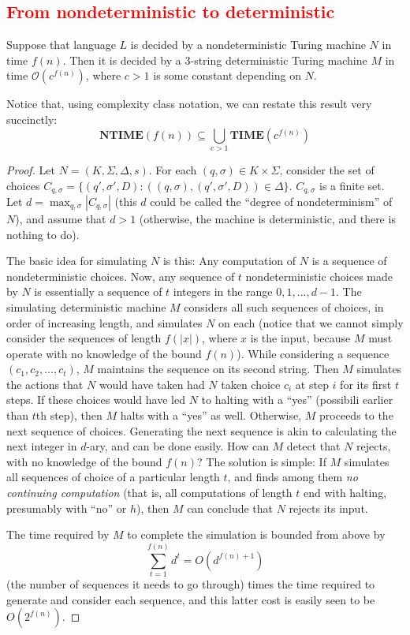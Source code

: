 \documentclass[12pt]{article}
\begin{document}
\subsection{\textcolor{red}{From nondeterministic to deterministic}}
\begin{defbox}[\textcolor{red}{Theorem (from nondeterministic to deterministic)}]
  Suppose that language $L$ is decided by a nondeterministic Turing machine $N$ in time $f(n)$. Then it is decided by a 3-string deterministic Turing machine $M$ in time $\mathcal{O}(c^{f(n)})$, where $c > 1$ is some constant depending on $N$.

Notice that, using complexity class notation, we can restate this result very succinctly:
\[
\textbf{NTIME}(f(n)) \subseteq \bigcup_{c > 1} \textbf{TIME}(c^{f(n)})
\]
\end{defbox}
\begin{proof}
  Let $N = (K, \Sigma, \Delta, s)$. For each $(q, \sigma) \in K \times \Sigma$, consider the set of choices $C_{q,\sigma} = \{(q', \sigma', D) : ((q, \sigma), (q', \sigma', D)) \in \Delta\}$. $C_{q,\sigma}$ is a finite set. Let $d = \max_{q,\sigma} |C_{q,\sigma}|$ (this $d$ could be called the ``degree of nondeterminism'' of $N$), and assume that $d > 1$ (otherwise, the machine is deterministic, and there is nothing to do).

The basic idea for simulating $N$ is this: Any computation of $N$ is a sequence of nondeterministic choices. Now, any sequence of $t$ nondeterministic choices made by $N$ is essentially a sequence of $t$ integers in the range $0, 1, \ldots, d - 1$. The simulating deterministic machine $M$ considers all such sequences of choices, in order of increasing length, and simulates $N$ on each (notice that we cannot simply consider the sequences of length $f(|x|)$, where $x$ is the input, because $M$ must operate with no knowledge of the bound $f(n)$). While considering a sequence $(c_1, c_2, \ldots, c_t)$, $M$ maintains the sequence on its second string. Then $M$ simulates the actions that $N$ would have taken had $N$ taken choice $c_i$ at step $i$ for its first $t$ steps. If these choices would have led $N$ to halting with a ``yes'' (possibili earlier than $t$th step), then $M$ halts with a ``yes'' as well. Otherwise, $M$  proceeds to the next sequence of choices. Generating the next sequence is akin to calculating the next integer in $d$-ary, and can be done easily.
How can $M$ detect that $N$ rejects, with no knowledge of the bound $f(n)$? 
The solution is simple: If $M$ simulates all sequences of choice of a particular 
length $t$, and finds among them \textit{no continuing computation} (that is, all 
computations of length $t$ end with halting, presumably with ``no'' or $h$), then $M$ can 
conclude that $N$ rejects its input.

The time required by $M$ to complete the simulation is bounded from above 
by 
\[
\sum_{t=1}^{f(n)} d^t = O(d^{f(n)+1})
\]
(the number of sequences it needs to go through) times the time required to generate and consider each sequence, and this latter cost is easily seen to be $O(2^{f(n)})$.
\end{proof}
\end{document}
